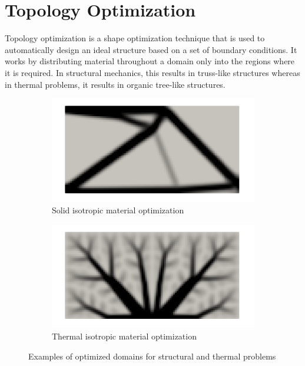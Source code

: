 \section{Topology Optimization}
\label{chap:topology_optimization}
Topology optimization is a shape optimization technique that is used to automatically design an ideal structure based on a set of boundary conditions. It works by distributing material throughout a domain only into the regions where it is required. In structural mechanics, this results in truss-like structures whereas in thermal problems, it results in organic tree-like structures. 
\begin{figure}[ht]
    \centering
    \begin{subfigure}[b]{0.49\linewidth}
        \includegraphics[width=\linewidth]{figures/chapter_3/SolidOpt.png}
        \caption{Solid isotropic material optimization}
    \end{subfigure}
    \begin{subfigure}[b]{0.49\linewidth}
        \includegraphics[width=\linewidth]{figures/chapter_3/ThermalOpt.png}
        \caption{Thermal isotropic material optimization}
    \end{subfigure}
    \caption{Examples of optimized domains for structural and thermal problems}
\end{figure}

